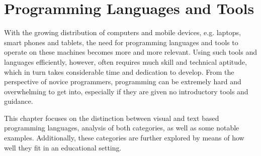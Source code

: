 \chapter{Programming Languages and Tools}
\label{chap:languages_and_tools}

With the growing distribution of computers and mobile devices, e.g. laptops, smart phones and tablets, the need for programming languages and tools to operate on these machines becomes more and more relevant. Using such tools and languages efficiently, however, often requires much skill and technical aptitude, which in turn takes considerable time and dedication to develop. From the perspective of novice programmers, programming can be extremely hard and overwhelming to get into, especially if they are given no introductory tools and guidance.

This chapter focuses on the distinction between visual and text based programming languages, analysis of both categories, as well as some notable examples. Additionally, these categories are further explored by means of how well they fit in an educational setting.   



